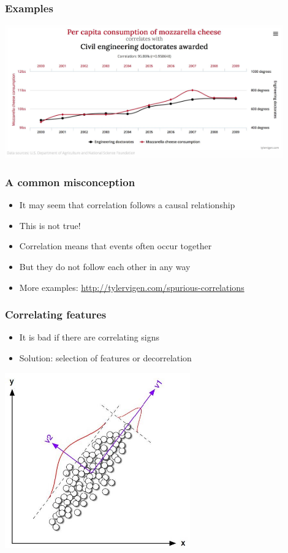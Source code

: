 \documentclass[default]{beamer}
\begin{document}
	\begin{frame}	
		\frametitle{Examples}
		
		\centering
		\includegraphics[width=0.9\textwidth]{linear_35.jpg}
	\end{frame}

	\begin{frame}	
		\frametitle{A common misconception}
		
		\Large
		\begin{itemize}
			\item It may seem that correlation follows a causal relationship
			\item This is not true!
			\item Correlation means that events often occur together
			\item But they do not follow each other in any way
			\item More examples: \url{http://tylervigen.com/spurious-correlations} 
		\end{itemize}
		
	\end{frame}

	\begin{frame}	
		\frametitle{Correlating features}
		
		\Large
		\begin{itemize}
			\item It is bad if there are correlating signs
			\item Solution: selection of features or decorrelation
		\end{itemize}
		
		\centering
		\includegraphics[width=0.6\textwidth]{linear_36.jpg}
	\end{frame}
\end{document}
